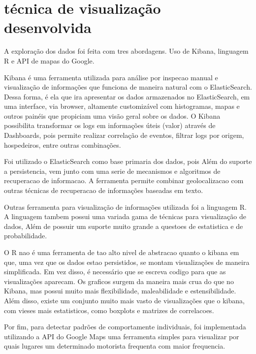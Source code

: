 \documentclass[10pt, conference]{IEEEtran}
\begin{document}
\section{técnica de visualização desenvolvida}
\label{sec:technique}
%

A exploração dos dados foi feita com tres abordagens. Uso de Kibana, linguagem R
e API de mapas do Google.

Kibana é uma ferramenta utilizada para análise por inspecao manual e visualização
de informações que funciona de maneira natural com o ElasticSearch. Dessa  forma, 
é  ela  que ira apresentar os dados armazenados no ElasticSearch, em uma interface,  via
browser, altamente customizável com histogramas, mapas e outros painéis que propiciam uma visão
geral sobre os dados.  O Kibana possibilita transformar os logs em informações úteis (valor)
através  de Dashboards,  pois  permite  realizar  correlação  de  eventos,  filtrar logs
por  origem, hospedeiros, entre outras combinações.

Foi utilizado o ElasticSearch como base primaria dos dados, pois Além do suporte a persistencia,
vem junto com uma serie de mecanismos e algoritmos de recuperacao de informacao. A ferramenta
permite combinar geolocalizacao com outras técnicas de recuperacao de informações baseadas
em texto.

Outras ferramenta para visualização de informações utilizada foi a linguagem R. A linguagem
tambem possui uma variada gama de técnicas para visualização de dados, Além de possuir um
suporte muito grande a questoes de estatistica e de probabilidade. 

O R nao é uma ferramenta de tao alto nivel de abstracao quanto o kibana em que, uma vez
que os dados estao persistidos, se montam visualizações de maneira simplificada. Em
vez disso, é necessário
que se escreva codigo para que as visualizações aparecam. Os graficos surgem da maneira
mais crua do que no Kibana, mas possui muito mais flexibilidade, maleabilidade
e estensibilidade. Além disso, existe um conjunto muito mais vasto de visualizações
que o kibana, com vieses mais estatisticos, como boxplots e matrizes de correlacoes.

Por fim, para detectar padrões de comportamente individuais, foi implementada utilizando
a API do Google Maps uma ferramenta simples para visualizar por quais lugares um determinado
motorista frequenta com maior frequencia.

\end{document}
